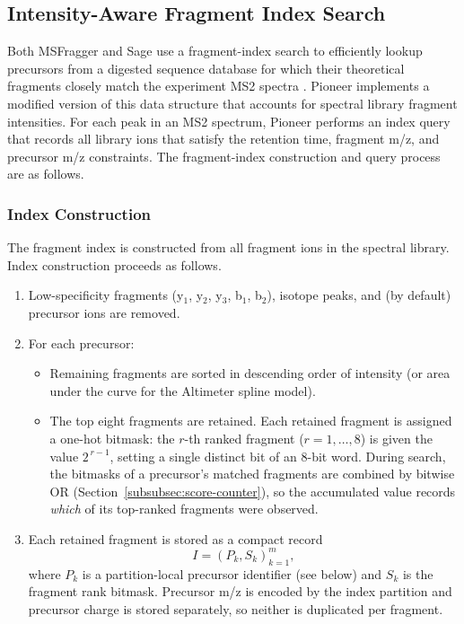 \documentclass[pdflatex,sn-nature]{sn-jnl}
\begin{document}
\subsection{Intensity-Aware Fragment Index Search}\label{subsec:fragment-index-search}

Both MSFragger and Sage use a fragment-index search to efficiently lookup precursors from a digested sequence database for which their theoretical fragments closely match the experiment MS2 spectra \cite{Kong2017-gg,Lazear2023-ci}. Pioneer implements a modified version of this data structure that accounts for spectral library fragment intensities. For each peak in an MS2 spectrum, Pioneer performs an index query that records all library ions that satisfy the retention time, fragment m/z, and precursor m/z constraints. The fragment-index construction and query process are as follows.

\subsubsection{Index Construction}\label{subsubsec:index-construction}

The fragment index is constructed from all fragment ions in the spectral library. Index construction proceeds as follows.

\begin{enumerate}

\item Low-specificity fragments (y$_1$, y$_2$, y$_3$, b$_1$, b$_2$), isotope peaks, and (by default) precursor ions are removed.

\item For each precursor:
    \begin{itemize}
        \item Remaining fragments are sorted in descending order of intensity (or area under the curve for the Altimeter spline model).
        \item The top eight fragments are retained. Each retained fragment is assigned a one-hot bitmask: the $r$-th ranked fragment ($r = 1,\dots,8$) is given the value $2^{\,r-1}$, setting a single distinct bit of an 8-bit word. During search, the bitmasks of a precursor's matched fragments are combined by bitwise OR (Section~\ref{subsubsec:score-counter}), so the accumulated value records \emph{which} of its top-ranked fragments were observed.
    \end{itemize}

\item Each retained fragment is stored as a compact record
\[
I = (P_k, S_k)_{k=1}^m,
\]
where $P_k$ is a partition-local precursor identifier (see below) and $S_k$ is the fragment rank bitmask. Precursor m/z is encoded by the index partition and precursor charge is stored separately, so neither is duplicated per fragment.
\end{enumerate}
\end{document}

